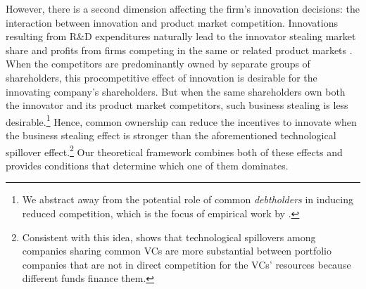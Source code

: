 \documentclass[12pt]{article}
\begin{document}
However, there is a second dimension affecting the firm's innovation decisions: the interaction between innovation and product market competition. Innovations resulting from R\&D expenditures naturally lead to the innovator stealing market share and profits from firms competing in the same or related product markets \citep{bloom2013}. When the competitors are predominantly owned by separate groups of shareholders, this procompetitive effect of innovation is desirable for the innovating company's shareholders. But when the same shareholders own both the innovator and its product market competitors, such business stealing is less desirable.\footnote{We abstract away from the potential role of common \emph{debtholders} in inducing reduced competition, which is the focus of empirical work by \citet{saidi2021bank}.} Hence, common ownership can reduce the incentives to innovate when the business stealing effect is stronger than the aforementioned technological spillover effect.\footnote{Consistent with this idea, \cite{gonzalez2020exchanges} shows that technological spillovers among companies sharing common VCs are more substantial between portfolio companies that are not in direct competition for the VCs' resources because different funds finance them.} Our theoretical framework combines both of these effects and provides conditions that determine which one of them dominates.
\end{document}
